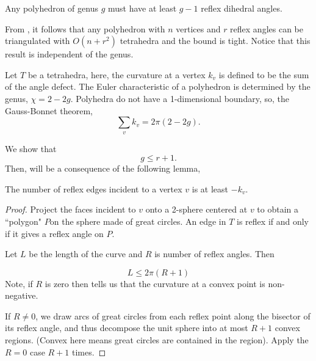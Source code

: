 \begin{theorem}\label{thm:reflex}

Any polyhedron of genus $g$ must have 
at least $g-1$ reflex dihedral angles. 

\end{theorem}

From , it follows that any polyhedron
with $n$ vertices and $r$ reflex angles
can be triangulated with $O(n+r^2)$ tetrahedra 
and the bound is tight. Notice that this result is independent
of the genus.

Let $T$ be a tetrahedra, here, the curvature at a vertex $k_v$ is defined to
be the sum of the angle defect.
The Euler characteristic of a polyhedron is determined by the genus,
$\chi=2-2g$.
Polyhedra do not have a 1-dimensional boundary, 
so, the Gauss-Bonnet theorem,
$$\sum_vk_v=2\pi (2-2g).$$

We show that
$$g\leq r+1.$$ 
Then,  will be a consequence of the following
lemma,

\begin{lemma}\label{lem:reflex-edge}
The number of reflex edges  incident to a vertex $v$  is at least $-k_v.$
\end{lemma}

\begin{proof}
Project the faces incident to $v$ onto a 2-sphere centered at $v$
to obtain a ``polygon" $P$on the sphere made  of great circles.
An edge in $T$ is reflex if and only if it gives  a reflex angle on $P$.

Let $L$ be the length of the curve and $R$ is  number of reflex  angles.
Then

\begin{equation} \label{eqn:length-reflex}
L\leq 2\pi (R+1)
\end{equation}
Note, if $R$ is zero then 
tells us that the curvature at a convex point is non-negative.

If $R\neq 0$, we draw arcs of great circles from each reflex point
along the bisector of its reflex angle, and thus decompose the unit sphere
into at most $R+1$ convex regions. (Convex here means
great circles are contained in the region).
Apply the $R=0$ case $R+1$ times.

\end{proof}




